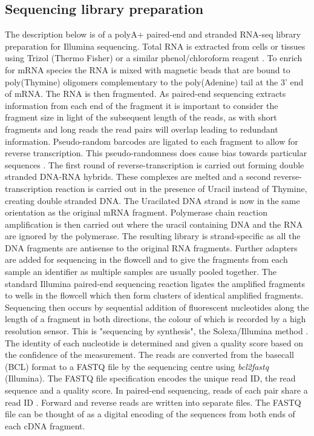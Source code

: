 \subsection{Sequencing library preparation}

The description below is of a polyA+ paired-end and  stranded RNA-seq library preparation for Illumina sequencing.
Total RNA is extracted from cells or tissues using Trizol (Thermo Fisher) or a similar phenol/chloroform reagent \citep{Chomczynski1987}. 
To enrich for mRNA species the RNA is mixed with magnetic beads that are bound to poly(Thymine) oligomers complementary to the poly(Adenine) tail at the 3' end of mRNA. 
The RNA is then fragmented. 
As paired-end sequencing extracts information from each end of the fragment it is important to consider the fragment size in light of the subsequent length of the reads, as with short fragments and long reads the read pairs will overlap leading to redundant information. 
Pseudo-random barcodes are ligated to each fragment to allow for reverse transcription. 
This pseudo-randomness does cause bias towards particular sequences \citep{VanGurp2013}.
The first round of reverse-transcription is carried out forming double stranded DNA-RNA hybrids. 
These complexes are melted and a second reverse-transcription reaction is carried out in the presence of Uracil instead of Thymine, creating double stranded DNA. The Uracilated DNA strand is now in the same orientation as the original mRNA fragment. 
Polymerase chain reaction amplification is then carried out where the uracil containing DNA and the RNA are ignored by the polymerase. 
The resulting library is strand-specific as all the DNA fragments are antisense to the original RNA fragments. Further adapters are added for sequencing in the flowcell and to give the fragments from each sample an identifier as multiple samples are usually pooled together. 
The standard Illumina paired-end sequencing reaction ligates the amplified fragments to wells in the flowcell which then form clusters of identical amplified fragments. 
Sequencing then occurs by sequential addition of fluorescent nucleotides along the length of a fragment in both directions, the  colour of which is recorded by a high resolution sensor. 
This is "sequencing by synthesis", the Solexa/Illumina method \citep{Bentley2008}.
The identity of each nucleotide is determined and given a quality score based on the confidence of the measurement. 
The reads are converted from the basecall (BCL) format to a FASTQ file by the sequencing centre using \textit{bcl2fastq} (Illumina).
The FASTQ file specification \citep{Cock2009} encodes the unique read ID, the read sequence and a quality score. In paired-end sequencing, reads of each pair share a read ID . 
Forward and reverse reads are written into separate files.  
The FASTQ file can be thought of as a digital encoding of the sequences from both ends of each cDNA fragment.

